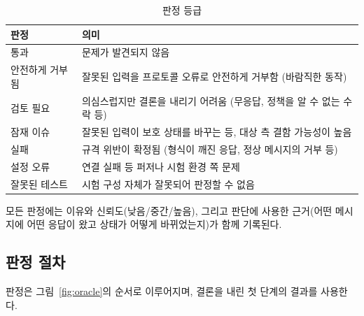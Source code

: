 \begin{table}[H]
\centering
\small
\caption{판정 등급}
\label{tab:verdicts}
\begin{tabularx}{\textwidth}{l Y}
\toprule
\textbf{판정} & \textbf{의미} \\
\midrule
통과 & 문제가 발견되지 않음 \\
안전하게 거부됨 & 잘못된 입력을 프로토콜 오류로 안전하게 거부함 (바람직한 동작) \\
검토 필요 & 의심스럽지만 결론을 내리기 어려움 (무응답, 정책을 알 수 없는 수락 등) \\
잠재 이슈 & 잘못된 입력이 보호 상태를 바꾸는 등, 대상 측 결함 가능성이 높음 \\
실패 & 규격 위반이 확정됨 (형식이 깨진 응답, 정상 메시지의 거부 등) \\
설정 오류 & 연결 실패 등 퍼저나 시험 환경 쪽 문제 \\
잘못된 테스트 & 시험 구성 자체가 잘못되어 판정할 수 없음 \\
\bottomrule
\end{tabularx}
\end{table}

모든 판정에는 이유와 신뢰도(낮음/중간/높음), 그리고 판단에 사용한 근거(어떤 메시지에 어떤 응답이 왔고 상태가 어떻게 바뀌었는지)가 함께 기록된다.

\subsection{판정 절차}

판정은 그림~\ref{fig:oracle}의 순서로 이루어지며, 결론을 내린 첫 단계의 결과를 사용한다.

